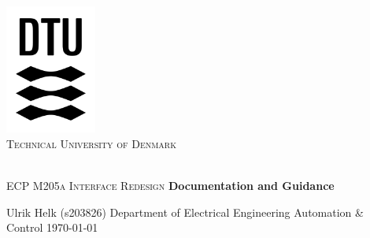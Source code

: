 \begin{titlepage}
	\begin{center}
		\includegraphics[width=3cm]{figures/text_logo_black.pdf}\\
		\vskip0.75cm
		\large{\textsc{Technical University of Denmark}}\\
		\\
		\LARGE{\textsc{ECP M205a Interface Redesign}}
		\vskip0.75cm
		\textbf{\huge{Documentation and Guidance}} \\
		\vfill
	\end{center}
	\begin{center}
		\Large{Ulrik Helk (s203826)}
		\vfill
		\Large{Department of Electrical Engineering}
		\vskip0.25cm
		\large{Automation \& Control}
		\vskip2.5cm
		\monthyeardate\today
		\vfill
	\end{center}
\end{titlepage}
